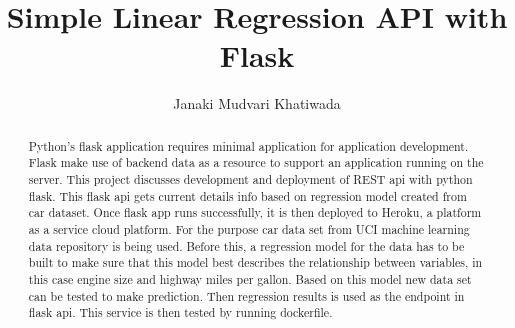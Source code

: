 
\title{Simple Linear Regression API with Flask}



\author{Janaki Mudvari Khatiwada}


\renewcommand{\shortauthors}{J. M. Khatiwada}



\begin{abstract}
  Python's flask application requires minimal application for application
  development. Flask make use of backend data as a resource to support an
  application running on the server. This project discusses development
  and deployment of REST api with python flask. This flask api gets current
  details
  info based on regression model created from car dataset. Once flask app runs 
  successfully, it is then deployed to Heroku, a platform as a service 
  cloud platform. For the purpose car data set from UCI machine learning
  data repository is being used. Before this, a regression model for the
  data has to be built to make sure that this model best describes the 
  relationship between variables, in this case engine size and highway
  miles per gallon. Based on this model new data set can be tested to make 
  prediction. Then regression results is used as the endpoint 
  in flask api. This service is then tested by running dockerfile.
   
\end{abstract}



\maketitle

